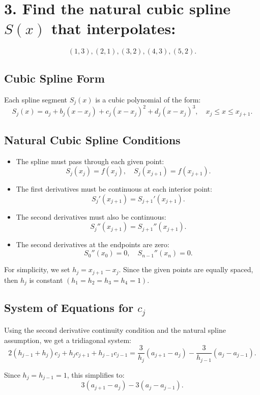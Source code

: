 \documentclass{article}
\begin{document}
\section*{3. Find the natural cubic spline $S(x)$ that interpolates:}
\[(1,3),(2,1),(3,2),(4,3),(5,2).\]

\subsection*{Cubic Spline Form}  
Each spline segment \( S_j(x) \) is a cubic polynomial of the form:
\[
S_j(x) = a_j + b_j (x - x_j) + c_j (x - x_j)^2 + d_j (x - x_j)^3, \quad x_j \leq x \leq x_{j+1}.
\]

\subsection*{Natural Cubic Spline Conditions}  
\begin{itemize}
    \item The spline must pass through each given point:
    \[
    S_j(x_j) = f(x_j), \quad S_j(x_{j+1}) = f(x_{j+1}).
    \]
   
    \item The first derivatives must be continuous at each interior point:
    \[
    S_j'(x_{j+1}) = S_{j+1}'(x_{j+1}).
    \]
    \item The second derivatives must also be continuous:
    \[
    S_j''(x_{j+1}) = S_{j+1}''(x_{j+1}).
    \]
    \item The second derivatives at the endpoints are zero:
    \[
    S_0''(x_0) = 0, \quad S_{n-1}''(x_n) = 0.
    \]
\end{itemize}

For simplicity, we set $h_j = x_{j+1} - x_j.$
Since the given points are equally spaced, then \( h_j \) is constant $(h_1=h_2=h_3=h_4 = 1)$.\\

\subsection*{System of Equations for \( c_j \)}  
Using the second derivative continuity condition and the natural spline assumption, we get a tridiagonal system:
\[
2(h_{j-1} + h_j)c_j + h_j c_{j+1} + h_{j-1} c_{j-1} = \frac{3}{h_j}(a_{j+1} - a_j) - \frac{3}{h_{j-1}}(a_j - a_{j-1}).
\]

Since $h_j = h_{j-1} = 1$, this simplifies to:
\[
3(a_{j+1} - a_j) - 3(a_j - a_{j-1}).
\]
\end{document}
